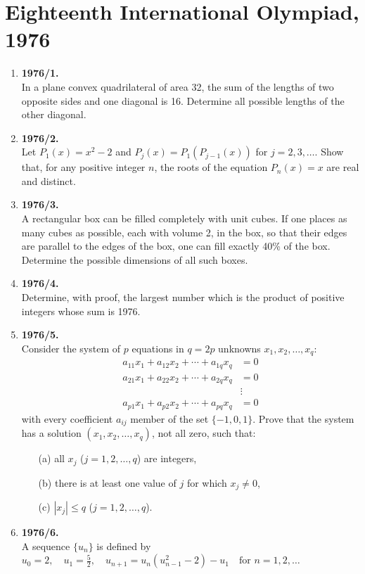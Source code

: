 \documentclass{article}
\begin{document}
\section*{Eighteenth International Olympiad, 1976}
\begin{enumerate}
\item\textbf{1976/1.} \\
In a plane convex quadrilateral of area 32, the sum of the lengths of two opposite sides and one diagonal is 16. Determine all possible lengths of the other diagonal.

\bigskip

\item\textbf{1976/2.} \\
Let $P_1(x) = x^2 - 2$ and $P_j(x) = P_1(P_{j-1}(x))$ for $j = 2, 3, \ldots$. Show that, for any positive integer $n$, the roots of the equation $P_n(x) = x$ are real and distinct.

\bigskip

\item\textbf{1976/3.} \\
A rectangular box can be filled completely with unit cubes. If one places as many cubes as possible, each with volume 2, in the box, so that their edges are parallel to the edges of the box, one can fill exactly 40\% of the box. Determine the possible dimensions of all such boxes.

\bigskip

\item\textbf{1976/4.} \\
Determine, with proof, the largest number which is the product of positive integers whose sum is 1976.

\bigskip

\item\textbf{1976/5.} \\
Consider the system of $p$ equations in $q = 2p$ unknowns $x_1, x_2, \ldots, x_q$:
\[
\begin{aligned}
a_{11}x_1 + a_{12}x_2 + \cdots + a_{1q}x_q &= 0 \\
a_{21}x_1 + a_{22}x_2 + \cdots + a_{2q}x_q &= 0 \\
&\vdots \\
a_{p1}x_1 + a_{p2}x_2 + \cdots + a_{pq}x_q &= 0
\end{aligned}
\]
with every coefficient $a_{ij}$ member of the set $\{-1, 0, 1\}$. Prove that the system has a solution $(x_1, x_2, \ldots, x_q)$, not all zero, such that:
\begin{itemize}
  \item[(a)] all $x_j$ ($j=1, 2, \ldots, q$) are integers,
  \item[(b)] there is at least one value of $j$ for which $x_j \ne 0$,
  \item[(c)] $|x_j| \le q$ ($j = 1, 2, \ldots, q$).
\end{itemize}

\bigskip

\item\textbf{1976/6.} \\
A sequence $\{u_n\}$ is defined by
$
u_0 = 2, \quad u_1 = \frac{5}{2}, \quad u_{n+1} = u_n(u_{n-1}^2 - 2) - u_{1} \quad \text{for } n = 1, 2, \ldots
$
\end{enumerate}
\end{document}
